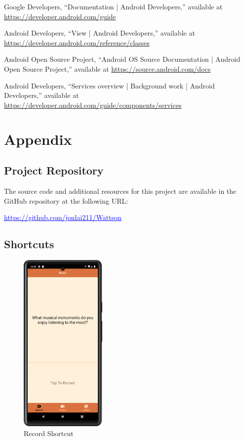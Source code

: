 \documentclass[conference,10pt,letterpaper]{IEEEtran}
\begin{document}
	\begin{thebibliography}{00}
		 Google Developers, ``Documentation | Android Developers,'' available at \url{https://developer.android.com/guide}
		
		 Android Developers, ``View | Android Developers,'' available at \url{https://developer.android.com/reference/classes}
		
		 Android Open Source Project, ``Android OS Source Documentation | Android Open Source Project,'' available at \url{https://source.android.com/docs}
		
		 Android Developers, ``Services overview | Background work | Android Developers,'' available at \url{https://developer.android.com/guide/components/services}
		
	\end{thebibliography}
	
	\newpage
	\appendix
	\section{Appendix}
	\subsection{Project Repository}
	The source code and additional resources for this project are available in the GitHub repository at the following URL:
	
	\href{https://github.com/jonlai211/Wattson}{\textcolor{blue}{\uline{https://github.com/jonlai211/Wattson}}}
	
	\subsection{Shortcuts}
	\begin{figure}[htbp]
		\centerline{\includegraphics[height=3.5in]{src/record shortcut.png}}
		\caption{Record Shortcut}
		\label{fig:record_shortcut}
	\end{figure}
	
\end{document}
